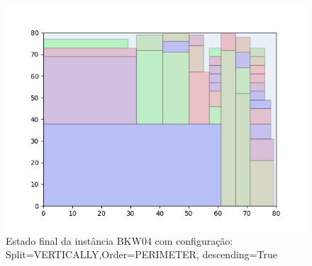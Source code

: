 \begin{figure}[H]
    \centering
    \caption[]{Estado final da instância BKW04 com configuração: Split=VERTICALLY,Order=PERIMETER, descending=True}
    \label{fig:bkw04-vertically-perimeter-true}
    \includegraphics[scale=0.5]{output/figures/bkw/bkw04/vertically/perimeter/true/00}
\end{figure}